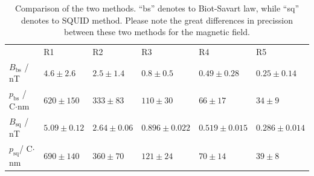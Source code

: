 \begin{table}[htb]
\caption{Comparison of the two methods. ``bs'' denotes to Biot-Savart law, while ``sq'' denotes to SQUID method. Please 
note the great differences in precission between these two methods for the magnetic field.}
\begin{tabular}{ l| p{2.3cm}|p{2.3cm}|p{2.3cm}|p{2.3cm}|p{2.3cm}}
 \rowcolor{tabcolor}& R1 & R2 & R3 & R4 & R5 \\ 
$B_{\mathrm{bs}}$ / nT &$4.6 \pm 2.6$&$2.5 \pm 1.4$ &$0.8 \pm 0.5$ &$0.49 \pm 0.28$ &$0.25 \pm 0.14$ \\ 
$p_{\mathrm{bs}}$ / C$\cdot$nm &$620 \pm 150$ &$333 \pm 83$ &$110 \pm 30$ &$66 \pm 17$ &$34 \pm 9$\\
$B_{\mathrm{sq}}$ / nT &$5.09 \pm 0.12$&$2.64 \pm 0.06$&$0.896 \pm 0.022$&$0.519 \pm 0.015$&$0.286 \pm 0.014$\\  
$p_{\mathrm{sq}}$/ C$\cdot$nm &$690 \pm 140$ & $360 \pm 70$ &$121 \pm 24$ & $70 \pm 14$ & $39 \pm 8$ \\
\end{tabular}
\label{tab:comparison}
\end{table}
\FloatBarrier
